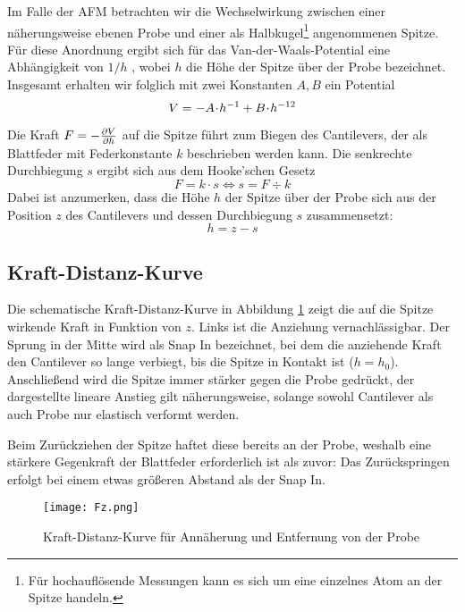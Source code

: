 Im Falle der AFM betrachten wir die Wechselwirkung zwischen einer näherungsweise ebenen Probe und einer als Halbkugel\footnote{Für hochauflösende Messungen kann es sich um eine einzelnes Atom an der Spitze handeln.} angenommenen Spitze. Für diese Anordnung ergibt sich für das Van-der-Waals-Potential eine Abhängigkeit von $1/h$ \cite[S. 5]{lit:hampp}, wobei $h$ die Höhe der Spitze über der Probe bezeichnet. Insgesamt erhalten wir folglich mit zwei Konstanten $A, B$ ein Potential
\begin{equation}
  V =  - A \!\cdot\! h^{-1} + B \!\cdot\! h^{-12} \label{eq:V_Spitze}
\end{equation}

Die Kraft $F = - \frac{\partial V}{\partial h}$ auf die Spitze führt zum Biegen des Cantilevers, der als Blattfeder mit Federkonstante $k$ beschrieben werden kann. Die senkrechte Durchbiegung $s$ ergibt sich aus dem Hooke'schen Gesetz
\begin{equation}
  F =  k \cdot s	\iff	s = F \div k
\end{equation}
Dabei ist anzumerken, dass die Höhe $h$ der Spitze über der Probe sich aus der Position $z$ des Cantilevers und dessen Durchbiegung $s$ zusammensetzt:
\begin{equation}
  h = z - s
\end{equation}


\subsection{Kraft-Distanz-Kurve}
Die schematische Kraft-Distanz-Kurve in Abbildung \ref{fig:Fz} zeigt die auf die Spitze wirkende Kraft in Funktion von $z$. Links ist die Anziehung vernachlässigbar. Der Sprung in der Mitte wird als Snap In bezeichnet, bei dem die anziehende Kraft den Cantilever so lange verbiegt, bis die Spitze in Kontakt ist ($h = h_0$). Anschließend wird die Spitze immer stärker gegen die Probe gedrückt, der dargestellte lineare Anstieg gilt näherungsweise, solange sowohl Cantilever als auch Probe nur elastisch verformt werden.

Beim Zurückziehen der Spitze haftet diese bereits an der Probe, weshalb eine stärkere Gegenkraft der Blattfeder erforderlich ist als zuvor: Das Zurückspringen erfolgt bei einem etwas größeren Abstand als der Snap In.

\begin{figure}[h]
	\centering
	\texttt{[image: Fz.png]}
	\caption{Kraft-Distanz-Kurve für Annäherung und Entfernung von der Probe \cite{lit:Fz}}
	\label{fig:Fz}
\end{figure}

